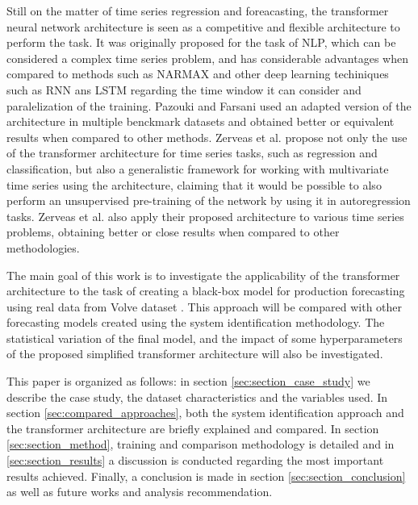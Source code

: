 \documentclass[conference]{IEEEtran}
\begin{document}
Still on the matter of time series regression and foreacasting, the transformer neural network architecture
is seen as a competitive and flexible architecture to perform the task. It was originally proposed 
for the task of NLP, which can be considered a complex time series problem, and has considerable advantages
when compared to methods such as NARMAX and other deep learning techiniques such as RNN ans LSTM regarding
the time window it can consider and paralelization of the training. Pazouki and Farsani \cite{transformers_ts_forecasting}
used an adapted version of the architecture in multiple benckmark datasets and obtained better or equivalent results when compared to
other methods. Zerveas et al. \cite{multivariate_ts_forecasting} propose not only the use of the transformer architecture
for time series tasks, such as regression and classification, but also a generalistic framework for working with multivariate
time series using the architecture, claiming that it would be possible to also perform an unsupervised pre-training of the network
by using it in autoregression tasks. Zerveas et al. \cite{multivariate_ts_forecasting} also apply their proposed architecture to various
time series problems, obtaining better or close results when compared to other methodologies.

The main goal of this work is to investigate the applicability of the transformer architecture
to the task of creating a black-box model for production forecasting using real data from Volve
dataset \cite{volve_data}. This approach will be compared with other forecasting models created
using the system identification methodology. The statistical variation of the final model, and 
the impact of some hyperparameters of the proposed simplified transformer architecture will also 
be investigated.



This paper is organized as follows: in section \ref{sec:section_case_study} we describe the case 
study, the dataset characteristics and the variables used. In section \ref{sec:compared_approaches}, 
both the system identification approach and the transformer architecture are briefly explained and compared.
In section \ref{sec:section_method}, training and comparison methodology is 
detailed and in \ref{sec:section_results} a discussion is conducted regarding the most important 
results achieved. Finally, a conclusion is made in section \ref{sec:section_conclusion} as well as 
future works and analysis recommendation.
\end{document}
